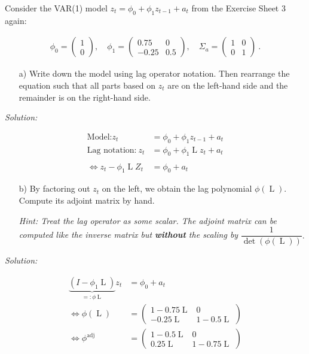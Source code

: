 \documentclass[12pt,a4paper]{article}
\newcommand{\Lag}{\operatorname{L}} %
\newcommand{\adj}{\operatorname{adj}}
\begin{document}
Consider the VAR(1) model \(z_t = \phi_0 + \phi_1 z_{t-1} + a_t\) from
the Exercise Sheet 3 again:

\begin{align*}
    \phi_0 = \begin{pmatrix} 1 \\ 0 \end{pmatrix}, \quad \phi_1 = \begin{pmatrix} 0.75 & 0 \\ -0.25 & 0.5 \end{pmatrix}, \quad \Sigma_a = \begin{pmatrix} 1 & 0 \\ 0 & 1 \end{pmatrix} \ \text{.}
\end{align*}

\begin{itemize}
    \item[a)] Write down the model using lag operator notation. Then rearrange the equation such that
all parts based on $z_t$ are on the left-hand side and the remainder is on the right-hand side. 
\end{itemize}

\emph{Solution:}

\begin{align*}
  \text{Model:} z_t & = \phi_0 + \phi_1 z_{t-1} + a_t\\  
  \text{Lag notation:} \ z_t & = \phi_0 + \phi_1 \Lag z_t + a_t\\
  \\
  \Leftrightarrow z_t - \phi_1 \Lag Z_t & = \phi_0 + a_t
\end{align*}

\begin{itemize}
    \item[b)] By factoring out $z_t$ on the left, we obtain the lag polynomial $\phi (\Lag)$. Compute its adjoint matrix by hand.
    \item[]  \textit{Hint: Treat the lag operator as some scalar. The adjoint matrix can be computed like the inverse matrix but \textbf{without} the scaling by}  $\dfrac{1}{\det (\phi (\Lag))} \text{.}$
\end{itemize}

\emph{Solution:}

\begin{align*}
  \underbrace{\left( I - \phi_1 \Lag \right)}_{=: \phi \Lag} z_t & = \phi_0 + a_t\\
  \Leftrightarrow \phi (\Lag) & = \begin{pmatrix} 1- 0.75 \Lag & 0 \\ -0.25 \Lag & 1 - 0.5 \Lag  \end{pmatrix}\\
  \Leftrightarrow  \phi^{\adj} & = \begin{pmatrix} 1- 0.5 \Lag & 0 \\ 0.25 \Lag & 1 - 0.75 \Lag  \end{pmatrix}\\
\end{align*}
\end{document}
